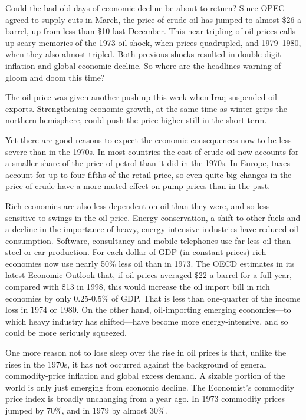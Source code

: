 Could the bad old days of economic decline be about to return? Since
OPEC agreed to supply-cuts in March, the price of crude oil has jumped
to almost \$26 a barrel, up from less than \$10 last December. This
near-tripling of oil prices calls up scary memories of the 1973 oil
shock, when prices quadrupled, and 1979--1980, when they also almost
tripled. Both previous shocks resulted in double-digit inflation and
global economic decline. So where are the headlines warning of gloom and
doom this time?

The oil price was given another push up this week when Iraq suspended
oil exports. Strengthening economic growth, at the same time as winter
grips the northern hemisphere, could push the price higher still in the
short term.

Yet there are good reasons to expect the economic consequences now to be
less severe than in the 1970s. In most countries the cost of crude oil
now accounts for a smaller share of the price of petrol than it did in
the 1970s. In Europe, taxes account for up to four-fifths of the retail
price, so even quite big changes in the price of crude have a more muted
effect on pump prices than in the past.

Rich economies are also less dependent on oil than they were, and so
less sensitive to swings in the oil price. Energy conservation, a shift
to other fuels and a decline in the importance of heavy,
energy-intensive industries have reduced oil consumption. Software,
consultancy and mobile telephones use far less oil than steel or car
production. For each dollar of GDP (in constant prices) rich economies
now use nearly 50\% less oil than in 1973. The OECD estimates in its
latest Economic Outlook that, if oil prices averaged \$22 a barrel for a
full year, compared with \$13 in 1998, this would increase the oil
import bill in rich economies by only 0.25-0.5\% of GDP. That is less
than one-quarter of the income loss in 1974 or 1980. On the other hand,
oil-importing emerging economies---to which heavy industry has
shifted---have become more energy-intensive, and so could be more
seriously squeezed.

One more reason not to lose sleep over the rise in oil prices is that,
unlike the rises in the 1970s, it has not occurred against the
background of general commodity-price inflation and global excess
demand. A sizable portion of the world is only just emerging from
economic decline. The Economist's commodity price index is broadly
unchanging from a year ago. In 1973 commodity prices jumped by 70\%, and
in 1979 by almost 30\%.


